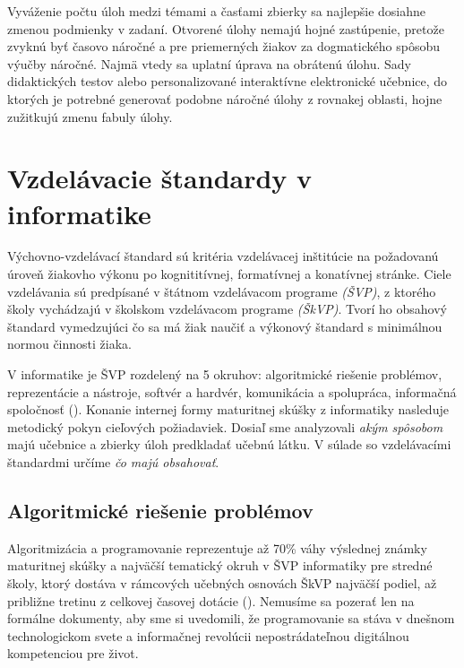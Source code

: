 Vyváženie počtu úloh medzi témami a časťami zbierky sa najlepšie dosiahne zmenou podmienky v zadaní. Otvorené úlohy nemajú hojné zastúpenie, pretože zvyknú byť časovo náročné a pre priemerných žiakov za dogmatického spôsobu výučby náročné. Najmä vtedy sa uplatní úprava na obrátenú úlohu. Sady didaktických testov alebo personalizované interaktívne elektronické učebnice, do ktorých je potrebné generovať podobne náročné úlohy z rovnakej oblasti, hojne zužitkujú zmenu fabuly úlohy.

\section{Vzdelávacie štandardy v informatike}
Výchovno-vzdelávací štandard sú kritéria vzdelávacej inštitúcie na požadovanú úroveň žiakovho výkonu po kognititívnej, formatívnej a konatívnej stránke. Ciele vzdelávania sú predpísané v štátnom vzdelávacom programe \emph{(ŠVP)}, z ktorého školy vychádzajú v školskom vzdelávacom programe \emph{(ŠkVP)}. Tvorí ho obsahový štandard vymedzujúci čo sa má žiak naučiť a výkonový štandard s minimálnou normou činnosti žiaka.

V informatike je ŠVP rozdelený na 5 okruhov: algoritmické riešenie problémov, reprezentácie a nástroje, softvér a hardvér, komunikácia a spolupráca, informačná spoločnosť (\cite{statny_2023}). Konanie internej formy maturitnej skúšky z informatiky nasleduje metodický pokyn cieľových požiadaviek. Dosiaľ sme analyzovali \emph{akým spôsobom} majú učebnice a zbierky úloh predkladať učebnú látku. V súlade so vzdelávacími štandardmi určíme \emph{čo majú obsahovať}.

\subsection{Algoritmické riešenie problémov}
Algoritmizácia a programovanie reprezentuje až 70\% váhy výslednej známky maturitnej skúšky a najväčší tematický okruh v ŠVP informatiky pre stredné školy, ktorý dostáva v rámcových učebných osnovách ŠkVP najväčší podiel, až približne tretinu z celkovej časovej dotácie (\cite{cp_2023}). Nemusíme sa pozerať len na formálne dokumenty, aby sme si uvedomili, že programovanie sa stáva v dnešnom technologickom svete a informačnej revolúcii nepostrádateľnou digitálnou kompetenciou pre život.

